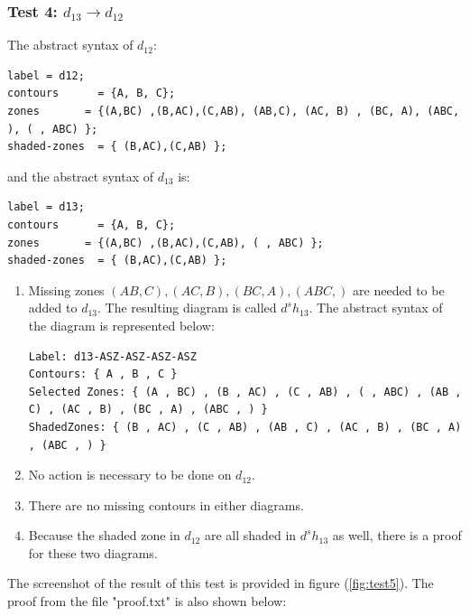 \documentclass[10pt, a4paper, titlepage]{article}
\begin{document}
\subsubsection{Test 4: $ d_{13} \rightarrow  d_{12} $}

The abstract syntax of $d _{12} $:
\small
\begin{lstlisting}
label = d12;
contours      = {A, B, C};
zones		= {(A,BC) ,(B,AC),(C,AB), (AB,C), (AC, B) , (BC, A), (ABC, ), ( , ABC) };
shaded-zones  = { (B,AC),(C,AB) };
\end{lstlisting}
\large

and the abstract syntax of $ d_{13} $ is:

\small
\begin{lstlisting}
label = d13;
contours      = {A, B, C};
zones		= {(A,BC) ,(B,AC),(C,AB), ( , ABC) };
shaded-zones  = { (B,AC),(C,AB) };
\end{lstlisting}
\large

\begin{enumerate}
\item Missing zones $ (AB,C), (AC, B) , (BC, A), (ABC, ) $ are needed to be added to $ d_{13} $. The resulting diagram is called $ d^sh_{13} $. The abstract syntax of the diagram is represented below:
\small
\begin{lstlisting}
Label: d13-ASZ-ASZ-ASZ-ASZ
Contours: { A , B , C } 
Selected Zones: { (A , BC) , (B , AC) , (C , AB) , ( , ABC) , (AB , C) , (AC , B) , (BC , A) , (ABC , ) }  
ShadedZones: { (B , AC) , (C , AB) , (AB , C) , (AC , B) , (BC , A) , (ABC , ) } 
\end{lstlisting}
\large
\item No action is necessary to be done on $ d_{12} $.
\item There are no missing contours in either diagrams.
\item Because the shaded zone in $ d_{12} $ are all shaded in $ d^sh_{13} $ as well, there is a proof for these two diagrams.
\end{enumerate}  

The screenshot of the result of this test is provided in figure (\ref{fig:test5}). The proof from the file "proof.txt" is also shown below:
\end{document}
